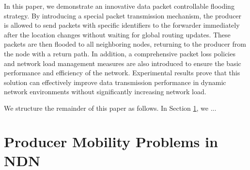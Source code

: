 \documentclass[conference]{IEEEtran}
\begin{document}

In this paper, we demonstrate an innovative data packet controllable flooding strategy. By introducing a special packet transmission mechanism, the producer is allowed to send packets with specific identifiers to the forwarder immediately after the location changes without waiting for global routing updates. These packets are then flooded to all neighboring nodes, returning to the producer from the node with a return path. In addition, a comprehensive packet loss policies and network load management measures are also introduced to ensure the basic performance and efficiency of the network. Experimental results prove that this solution can effectively improve data transmission performance in dynamic network environments without significantly increasing network load.





We structure the remainder of this paper as follows. 
In Section \ref{sec:problem}, we ...


\section{Producer Mobility Problems in NDN}
\label{sec:problem}
\end{document}
